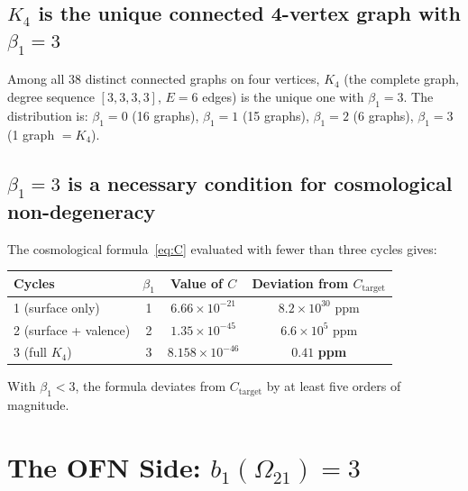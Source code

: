 \documentclass[11pt,a4paper]{article}
\begin{document}
\subsection{\texorpdfstring{$K_4$ is the unique connected 4-vertex graph with $\beta_1 = 3$}{K4 is the unique connected 4-vertex graph with beta1 = 3}}

\begin{result_box}[title={Script 1 --- Exhaustive enumeration}]
Among all 38 distinct connected graphs on four vertices, $K_4$ (the complete graph, degree sequence $[3,3,3,3]$, $E = 6$ edges) is the unique one with $\beta_1 = 3$. The distribution is: $\beta_1 = 0$ (16 graphs), $\beta_1 = 1$ (15 graphs), $\beta_1 = 2$ (6 graphs), $\beta_1 = 3$ (1 graph $= K_4$).
\end{result_box}

\subsection{\texorpdfstring{$\beta_1 = 3$}{beta1 = 3} is a necessary condition for cosmological non-degeneracy}

\begin{result_box}[title={Script 1 --- Degeneration test}]
The cosmological formula~\eqref{eq:C} evaluated with fewer than three cycles gives:
\begin{center}
\begin{tabular}{lccc}
\toprule
Cycles & $\beta_1$ & Value of $C$ & Deviation from $C_{\mathrm{target}}$ \\
\midrule
1 (surface only) & 1 & $6.66 \times 10^{-21}$ & $8.2 \times 10^{30}$ ppm \\
2 (surface + valence) & 2 & $1.35 \times 10^{-45}$ & $6.6 \times 10^{5}$ ppm \\
3 (full $K_4$) & 3 & $8.158 \times 10^{-46}$ & $\mathbf{0.41}$ \textbf{ppm} \\
\bottomrule
\end{tabular}
\end{center}
With $\beta_1 < 3$, the formula deviates from $C_{\mathrm{target}}$ by at least five orders of magnitude.
\end{result_box}

\section{The OFN Side: \texorpdfstring{$b_1(\Omega_{21}) = 3$}{b1(Omega21) = 3}}
\label{sec:ofn}
\end{document}
